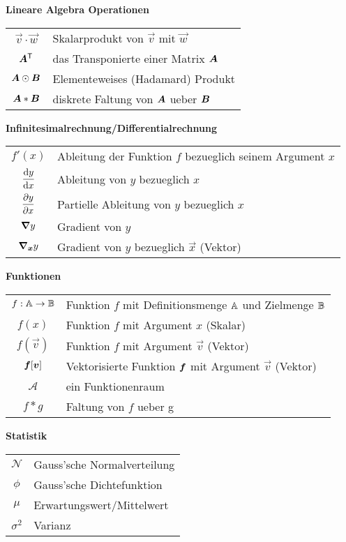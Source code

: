 \begin{center}\textbf{Lineare Algebra Operationen}\end{center}
\begin{tabular}{cl}
  $\vec{v} \cdot \vec{w}$ & Skalarprodukt von $\vec{v}$ mit $\vec{w}$ \\
  $\bm{A}^{\mathsf{T}}$ & das Transponierte einer Matrix $\bm{A}$ \\
  $\bm{A} \odot \bm{B}$ & Elementeweises (Hadamard) Produkt \\
  $\bm{A} * \bm{B}$ & diskrete Faltung von $\bm{A}$ ueber $\bm{B}$

\end{tabular}

\begin{center}\textbf{Infinitesimalrechnung/Differentialrechnung}\end{center}
\begin{tabular}{cl}
  $f'(x)$ & Ableitung der Funktion $f$ bezueglich seinem Argument $x$ \\
  $\displaystyle\frac{\text{d}y}{\text{d}x}$ & Ableitung von $y$ bezueglich $x$ \\[2ex]
  $\displaystyle\frac{\partial y}{\partial x}$ & Partielle Ableitung von $y$ bezueglich $x$ \\[2ex]
  $\bm{\nabla} y$ & Gradient von $y$\\
  $\bm{\nabla}_{\bm{x}}y$ & Gradient von $y$ bezueglich $\vec{x}$ (Vektor) \\

\end{tabular}

\begin{center}\textbf{Funktionen}\end{center}
\begin{tabular}{cl}
  $f: \mathbb{A} \to \mathbb{B}$ & Funktion $f$ mit Definitionsmenge $\mathbb{A}$ und Zielmenge $\mathbb{B}$ \\
  $f(x)$ & Funktion $f$ mit Argument $x$ (Skalar) \\
  $f(\vec{v})$ & Funktion $f$ mit Argument $\vec{v}$ (Vektor) \\
  $\bm{f}[\bm{v}]$ & Vektorisierte Funktion $\bm{f}$ mit Argument $\vec{v}$ (Vektor) \\
  $\mathcal{A}$ & ein Funktionenraum \\
  $f * g$ & Faltung von $f$ ueber g \\

\end{tabular}

\begin{center}\textbf{Statistik}\end{center}
\begin{tabular}{cl}
  $\mathcal{N}$ & Gauss'sche Normalverteilung \\
  $\phi$ & Gauss'sche Dichtefunktion \\
  $\mu$ & Erwartungswert/Mittelwert \\
  $\sigma^2$ & Varianz
\end{tabular}

